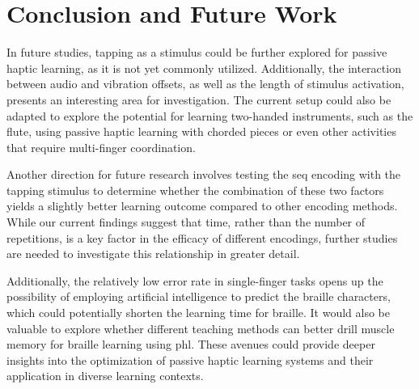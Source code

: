 \chapter{Conclusion and Future Work}
\label{ch:conclusion}

In future studies, tapping as a stimulus could be further explored for passive haptic learning, as it is not yet commonly utilized. Additionally, the interaction between audio and vibration offsets, as well as the length of stimulus activation, presents an interesting area for investigation. The current setup could also be adapted to explore the potential for learning two-handed instruments, such as the flute, using passive haptic learning with chorded pieces or even other activities that require multi-finger coordination.

Another direction for future research involves testing the \gls{seq} encoding with the tapping stimulus to determine whether the combination of these two factors yields a slightly better learning outcome compared to other encoding methods. While our current findings suggest that time, rather than the number of repetitions, is a key factor in the efficacy of different encodings, further studies are needed to investigate this relationship in greater detail.

Additionally, the relatively low error rate in single-finger tasks opens up the possibility of employing artificial intelligence to predict the braille characters, which could potentially shorten the learning time for braille. It would also be valuable to explore whether different teaching methods can better drill muscle memory for braille learning using \gls{phl}. These avenues could provide deeper insights into the optimization of passive haptic learning systems and their application in diverse learning contexts.

